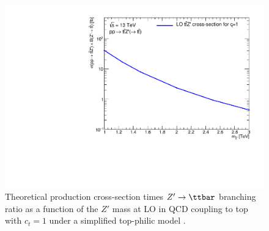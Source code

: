 \documentclass[../thesis.tex]{subfiles}
\begin{document}
\begin{figure}[!htb]
\begin{center}
\includegraphics[width=0.8\linewidth]{fig/theory_ttZp_limit.pdf}
\caption[Theoretical \ttZp production cross-section times $Z'\rightarrow\ttbar$ branching ratio as a function of the $Z'$ mass at LO in QCD coupling to top with $c_t=1$ under a simplified top-philic model.]{\label{fig:theory:ttZp_limit}Theoretical \ttZp production cross-section times $Z'\rightarrow\ttbar$ branching ratio as a function of the $Z'$ mass at \acs{LO} in \acs{QCD} coupling to top with $c_t=1$ under a simplified top-philic model \citep{NewPhysicsWorkingGroup:2010hhy,theory:ttZp,theory:ttZp_LHC}.}
\end{center}
\end{figure}


%
\end{document}
